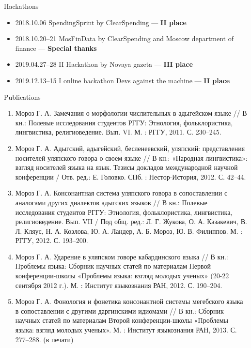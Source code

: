 \documentclass{resume} %
\begin{document}
\begin{rSection}{Hackathons}
\begin{itemize}
\item 2018.10.06  SpendingSprint by ClearSpending  --- \textbf{II place}
\item 2018.10.20--21  MosFinData by ClearSpending and Moscow department of finance
 --- \textbf{Special thanks}
\item  2019.04.27--28 II Hackathon by Novaya gazeta --- \textbf{III place}
\item 2019.12.13--15 I online hackathon Devs against the machine --- \textbf{II place}
\end{itemize}

\end{rSection}


\begin{rSection}{Publications}
\begin{enumerate}
\item Мороз Г. А. Замечания о морфологии числительных в адыгейском языке // В кн.: Полевые исследования студентов РГГУ: Этнология, фольклористика, лингвистика, религиоведение. Вып. VI. М. : РГГУ, 2011. С. 230--245.
\item Мороз Г. А. Адыгский, адыгейский, бесленеевский, уляпский: представления носителей уляпского говора о своем языке // В кн.: «Народная лингвистика»: взгляд носителей языка на язык. Тезисы докладов международной научной конференции / Отв. ред.: Е. Головко. СПб. : Нестор-История, 2012. С. 42--44.
\item Мороз Г. А. Консонантная система уляпского говора в сопоставлении с аналогами других диалектов адыгских языков // В кн.: Полевые исследования студентов РГГУ: Этнология, фольклористика, лингвистика, религиоведение. Вып. VII / Под общ. ред.: Л. Г. Жукова, О. А. Казакевич, В. Л. Кляус, Н. А. Козлова, Ю. А. Ландер, А. Б. Мороз, Ю. В. Филиппов. М. : РГГУ, 2012. С. 193--200.
\item Мороз Г. А. Ударение в уляпском говоре кабардинского языка // В кн.: Проблемы языка: Сборник научных статей по материалам Первой конференции-школы «Проблемы языка: взгляд молодых ученых» (20-22 сентября 2012 г.). М. : Институт языкознания РАН, 2012. С. 190--204.
\item Мороз Г. А. Фонология и фонетика консонантной системы мегебского языка в сопоставлении с другими даргинскими идиомами // В кн.: Сборник научных статей по материалам Второй конференции-школы «Проблемы языка: взгляд молодых ученых». М. : Институт языкознания РАН, 2013. С. 277--288. (в печати)

\end{enumerate}
\end{rSection}
\end{document}
